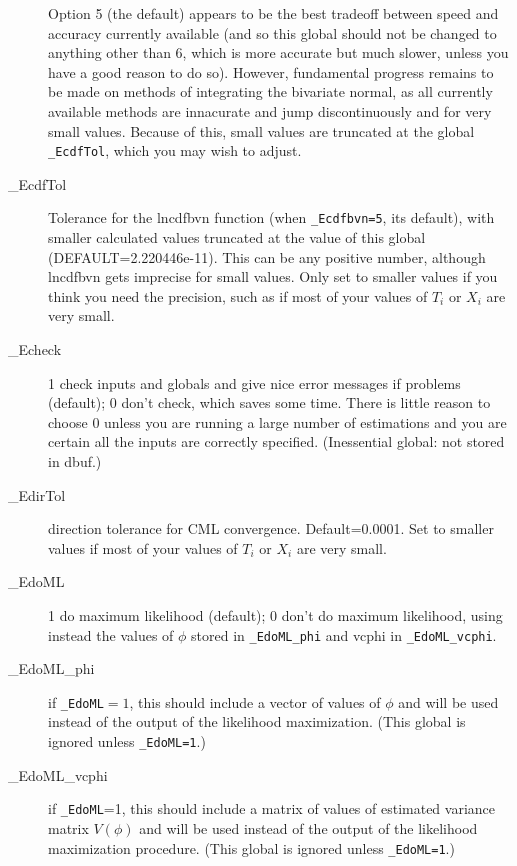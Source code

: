 \documentclass[11pt,titlepage]{article}
\begin{document}
\begin{description}
  Option 5 (the default) appears to be the best tradeoff between speed
  and accuracy currently available (and so this global should not be
  changed to anything other than 6, which is more accurate but much
  slower, unless you have a good reason to do so).  However,
  fundamental progress remains to be made on methods of integrating
  the bivariate normal, as all currently available methods are
  innacurate and jump discontinuously and for very small values.
  Because of this, small values are truncated at the global
  \texttt{\_EcdfTol}, which you may wish to adjust.

\item[\_EcdfTol] Tolerance for the lncdfbvn function (when
  \texttt{\_Ecdfbvn=5}, its default), with smaller calculated values
  truncated at the value of this global (DEFAULT=2.220446e-11).  This
  can be any positive number, although lncdfbvn gets imprecise for
  small values.  Only set to smaller values if you think you need the
  precision, such as if most of your values of $T_i$ or $X_i$ are very
  small.

\item[\_Echeck] 1 check inputs and globals and give nice error
  messages if problems (default); 0 don't check, which saves some
  time.  There is little reason to choose 0 unless you are running a
  large number of estimations and you are certain all the inputs are
  correctly specified.  (Inessential global: not stored in dbuf.)

\item[\_EdirTol] direction tolerance for CML convergence.
  Default=0.0001.  Set to smaller values if most of your values of
  $T_i$ or $X_i$ are very small.

\item[\_EdoML] 1 do maximum likelihood (default); 0 don't do maximum
  likelihood, using instead the values of $\phi$ stored in
  \texttt{\_EdoML\_phi} and vcphi in \texttt{\_EdoML\_vcphi}.

\item[\_EdoML\_phi] if \texttt{\_EdoML}$=1$, this should include a
  vector of values of $\phi$ and will be used instead of the output of
  the likelihood maximization.  (This global is ignored unless
  \texttt{\_EdoML=1}.)

\item[\_EdoML\_vcphi] if \texttt{\_EdoML}=1, this should include a
  matrix of values of estimated variance matrix $V(\phi)$ and will be
  used instead of the output of the likelihood maximization procedure.
  (This global is ignored unless \texttt{\_EdoML=1}.)


\end{description}
\end{document}

